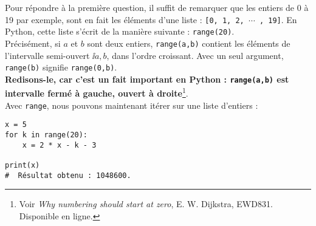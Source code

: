 Pour répondre à la première question, il suffit de remarquer que les entiers de 0 à 19 par exemple, 
sont en fait les éléments d'une liste : \texttt{[0, 1, 2, $\cdots$ , 19]}. En Python, cette liste 
s'écrit de la manière suivante : \texttt{range(20)}.\\
Précisément, si $a$ et $b$ sont deux entiers, \texttt{range(a,b)} contient les éléments de 
l'intervalle semi-ouvert $\ii{a,b}$, dans l'ordre croissant. Avec un seul argument, 
\texttt{range(b)} signifie \texttt{range(0,b)}.\\

\textbf{
Redisons-le, car c'est un fait important en Python : \texttt{range(a,b)} est intervalle 
\textbf{fermé} à gauche, \textbf{ouvert} à
droite}\footnote{Voir \textit{Why numbering should start at zero}, E. W. Dijkstra,
  EWD831. Disponible en ligne.}.\\
  
Avec \texttt{range}, nous pouvons maintenant itérer sur une liste d'entiers :

\begin{lstlisting}
x = 5
for k in range(20):
    x = 2 * x - k - 3
  
print(x)
#  Résultat obtenu : 1048600.
\end{lstlisting}

%

%
%
%
%
%
%  


